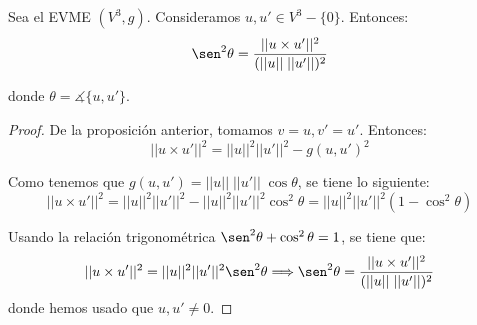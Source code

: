 \begin{comment}
\begin{proof} Realizamos la siguiente distinción:
    \begin{itemize}
        \item \underline{Supuesto $u$ linealmente dependiente a $u'$}: \begin{equation*}
            g( u\times u,v\times v') = g(u,v)g(u,v') -g(u,v')g(u, v) \Longleftrightarrow g(0,v\times v') = 0 \Longleftrightarrow 0=0
        \end{equation*}
        
        \item \underline{Supuesto $u$ linealmente independiente a $u'$}:
        
        Lo demostramos para una cierta base orientada positiva $\cc{B}_o = \{u,u', e_3\}$. Entonces:
        \begin{equation*}
            g( u\times u',v\times v')
            = g( e_3,v\times v')
            = g( u,v)g( u', v') -g( u,v')g( u', v)
        \end{equation*}
    \end{itemize}
\end{proof}
\end{comment}


\begin{coro}
Sea el EVME $(V^3,g)$. Consideramos $u,u'\in V^3-\{0\}$. Entonces:
    \begin{equation*}
        \sen ^2 \theta = \frac{||u\times u'||^2}{(||u||\;||u'||)^2}
    \end{equation*}

    donde $\theta = \measuredangle \{u,u'\}$.
\end{coro}
\begin{proof}
    De la proposición anterior, tomamos $v=u, v'=u'$. Entonces:
    \begin{equation*}
        ||u\times u'||^2 = ||u||^2 ||u'||^2 - g (u,u')^2 
    \end{equation*}

    Como tenemos que $g(u,u') = ||u||\;||u'||\;\cos \theta$, se tiene lo siguiente:
    \begin{equation*}
        ||u\times u'||^2 = ||u||^2||u'||^2 - ||u||^2||u'||^2\cos ^2 \theta
        = ||u||^2||u'||^2 (1-\cos^2 \theta)
    \end{equation*}

    Usando la relación trigonométrica $\sen^2 \theta +\cos^2 \theta  = 1$, se tiene que:
    \begin{equation*}
        ||u\times u'||^2 = ||u||^2 ||u'||^2\sen ^2 \theta \Longrightarrow
        \sen ^2 \theta = \frac{||u\times u'||^2}{(||u||\;||u'||)^2}
    \end{equation*}
    donde hemos usado que $u,u'\neq 0$.
    
\end{proof}

